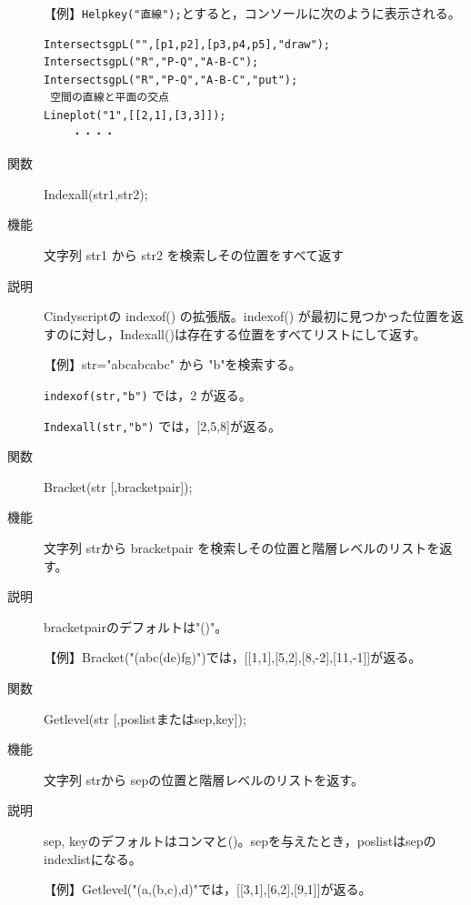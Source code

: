 \documentclass[papersize,a4paper,10pt,uplatex]{jsarticle}
\begin{document}
\begin{description}
\vspace{\baselineskip}
【例】\verb|Helpkey("直線");|とすると，コンソールに次のように表示される。
\begin{verbatim}
IntersectsgpL("",[p1,p2],[p3,p4,p5],"draw"); 
IntersectsgpL("R","P-Q","A-B-C"); 
IntersectsgpL("R","P-Q","A-B-C","put");
 空間の直線と平面の交点
Lineplot("1",[[2,1],[3,3]]);
 　　・・・・
\end{verbatim}

\vspace{\baselineskip}
\hypertarget{indexall}{}
\item[関数]Indexall(str1,str2);
\item[機能]文字列 str1 から str2 を検索しその位置をすべて返す
\item[説明]Cindyscriptの indexof() の拡張版。indexof() が最初に見つかった位置を返すのに対し，Indexall()は存在する位置をすべてリストにして返す。

\vspace{\baselineskip}
【例】str="abcabcabc" から "b"を検索する。

\verb|indexof(str,"b")| では，2 が返る。

\verb|Indexall(str,"b")| では，[2,5,8]が返る。

\vspace{\baselineskip}

\hypertarget{bracket}{}
\item[関数]Bracket(str [,bracketpair]);
\item[機能]文字列 strから bracketpair を検索しその位置と階層レベルのリストを返す。
\item[説明]bracketpairのデフォルトは"()"。

\vspace{\baselineskip}

【例】Bracket("(abc(de)fg)")では，[[1,1],[5,2],[8,-2],[11,-1]]が返る。

\vspace{\baselineskip}

\hypertarget{getlevel}{}
\item[関数]Getlevel(str [,poslistまたはsep,key]);
\item[機能]文字列 strから sepの位置と階層レベルのリストを返す。
\item[説明]sep, keyのデフォルトはコンマと()。sepを与えたとき，poslistはsepのindexlistになる。

\vspace{\baselineskip}

【例】Getlevel("(a,(b,c),d)"では，[[3,1],[6,2],[9,1]]が返る。


\end{description}
\end{document}
